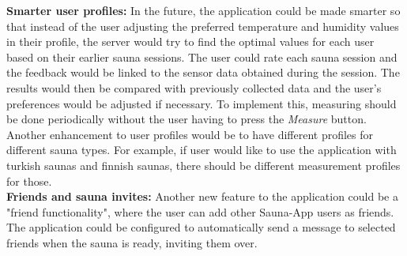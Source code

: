 \documentclass[11pt]{article}
\begin{document}
\noindent\textbf{Smarter user profiles:} In the future, the application could be made smarter so that instead of the user adjusting the preferred temperature and humidity values in their profile, the server would try to find the optimal values for each user based on their earlier sauna sessions. The user could rate each sauna session and the feedback would be linked to the sensor data obtained during the session. The results would then be compared with previously collected data and the user's preferences would be adjusted if necessary. To implement this, measuring should be done periodically without the user having to press the \textit{Measure} button. Another enhancement to user profiles would be to have different profiles for different sauna types. For example, if user would like to use the application with turkish saunas and finnish saunas, there should be different measurement profiles for those. \\

\noindent\textbf{Friends and sauna invites:} Another new feature to the application could be a "friend functionality", where the user can add other Sauna-App users as friends. The application could be configured to automatically send a message to selected friends when the sauna is ready, inviting them over. \\
\end{document}
